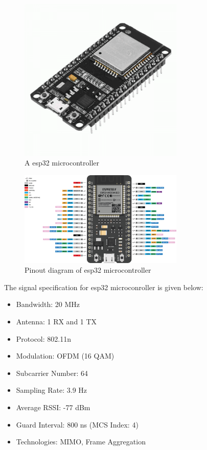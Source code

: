 \begin{figure}[H]
\centering
\includegraphics[width=0.7\textwidth]{./figure/chap 3/1.png}
\caption{ A esp32 microcontroller}
\label{Fig 3.1}
\end{figure}

\begin{figure}[H]
\centering
\includegraphics[width=0.7\textwidth]{./figure/chap 3/2.png}
\caption{Pinout diagram of esp32 microcontroller}
\label{Fig 3.2}
\end{figure}

The signal specification for esp32 microconroller is given below:
\begin{itemize}

\item    Bandwidth: 20 MHz
\item    Antenna: 1 RX and 1 TX
\item    Protocol: 802.11n
\item    Modulation: OFDM (16 QAM)
\item    Subcarrier Number:  64
\item    Sampling Rate:  3.9 Hz
\item    Average RSSI: -77 dBm
\item    Guard Interval: 800 ns (MCS Index: 4)
\item    Technologies: MIMO, Frame Aggregation

\end{itemize}

